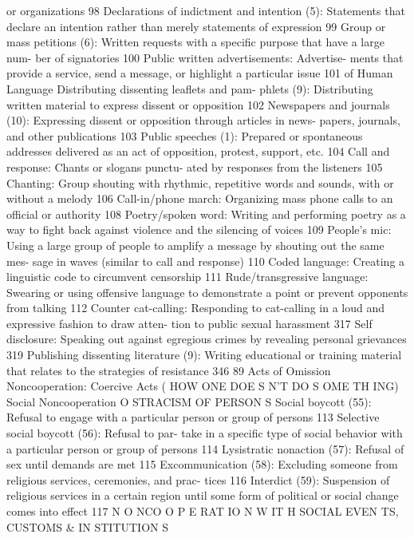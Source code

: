 \documentclass[twoside,a4paper,12pt,fleqn,openany]{extbook}
\begin{document}
or organizations
 98
Declarations of indictment and intention (5):
Statements that declare an intention rather
than merely statements of expression
 99
Group or mass petitions (6): Written requests
with a specific purpose that have a large num-
ber of signatories
 100
Public written advertisements: Advertise-
ments that provide a service, send a message,
or highlight a particular issue
 101
of Human Language
Distributing dissenting leaflets and pam-
phlets (9): Distributing written material to
express dissent or opposition
 102
Newspapers and journals (10): Expressing
dissent or opposition through articles in news-
papers, journals, and other publications 103
Public speeches (1): Prepared or spontaneous
addresses delivered as an act of opposition,
protest, support, etc.
 104
Call and response: Chants or slogans punctu-
ated by responses from the listeners
 105
Chanting: Group shouting with rhythmic,
repetitive words and sounds, with or without a
melody
 106
Call-in/phone march: Organizing mass phone
calls to an official or authority
 108
Poetry/spoken word: Writing and performing
poetry as a way to fight back against violence
and the silencing of voices
 109
People’s mic: Using a large group of people to
amplify a message by shouting out the same mes-
sage in waves (similar to call and response) 110
Coded language: Creating a linguistic code to
circumvent censorship
 111
Rude/transgressive language: Swearing or
using offensive language to demonstrate a
point or prevent opponents from talking 112
Counter cat-calling: Responding to cat-calling
in a loud and expressive fashion to draw atten-
tion to public sexual harassment
 317
Self disclosure: Speaking out against egregious
crimes by revealing personal grievances 319
Publishing dissenting literature (9): Writing
educational or training material that relates to
the strategies of resistance
 346
89
Acts of Omission
Noncooperation: Coercive Acts
( HOW ONE DOE S N’T DO S OME TH ING)
Social Noncooperation
O STRACISM OF PERSON S
Social boycott (55): Refusal to engage with a
particular person or group of persons
 113
Selective social boycott (56): Refusal to par-
take in a specific type of social behavior with a
particular person or group of persons
 114
Lysistratic nonaction (57): Refusal of sex until
demands are met
 115
Excommunication (58): Excluding someone
from religious services, ceremonies, and prac-
tices
 116
Interdict (59): Suspension of religious services
in a certain region until some form of political
or social change comes into effect
 117
N O NCO O P E RAT IO N W IT H SOCIAL EVEN TS, CUSTOMS & IN STITUTION S
\end{document}
